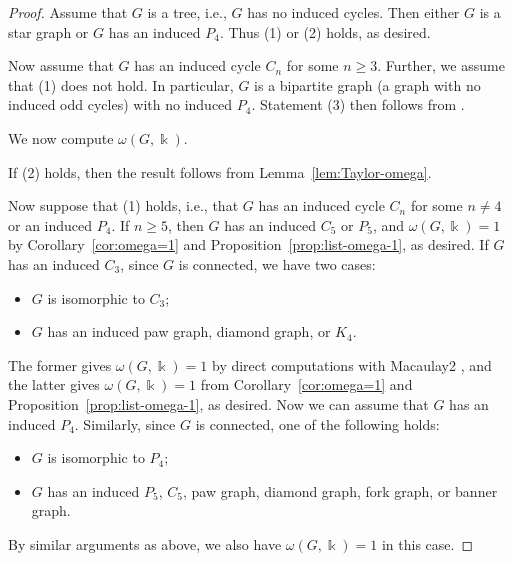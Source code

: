 \documentclass[reqno]{amsart}
\theoremstyle{definition}
\theoremstyle{remark}
\numberwithin{equation}{section}
\begin{document}
\begin{proof}
   Assume that $G$ is a tree, i.e., $G$ has no induced cycles. Then either $G$ is a star graph or $G$ has an induced $P_4$. Thus (1) or (2) holds, as desired.

    Now assume that $G$ has an induced cycle $C_n$ for some $n\geq 3$. Further, we assume that (1) does not hold. In particular, $G$ is a bipartite graph (a graph with no induced odd cycles) with no induced $P_4$. Statement (3) then follows from \cite[Lemma~2]{AlekseevLozin2004}.

    We now compute $\omega(G,\Bbbk)$. 
    
    If (2) holds, then the result follows from Lemma~\ref{lem:Taylor-omega}. 
    
    Now suppose that (1) holds, i.e., that $G$ has an induced cycle $C_n$ for some $n\neq 4$ or an induced $P_4$. If $n\geq 5$, then $G$ has an induced $C_5$ or $P_5$, and $\omega(G,\Bbbk)=1$ by Corollary~\ref{cor:omega=1}  and Proposition~\ref{prop:list-omega-1}, as desired. If $G$ has an induced $C_3$, since $G$ is connected, we have two cases:
    \begin{itemize}
        \item $G$ is isomorphic to $C_3$;
        \item $G$ has an induced paw graph, diamond graph, or $K_4$.
    \end{itemize}
    The former gives $\omega(G,\Bbbk)=1$ by direct computations with Macaulay2 \cite{M2}, and the latter gives $\omega(G,\Bbbk)=1$ from Corollary~\ref{cor:omega=1}  and Proposition~\ref{prop:list-omega-1}, as desired. Now we can assume that $G$ has an induced $P_4$. Similarly, since $G$ is connected, one of the following holds:
    \begin{itemize}
        \item $G$ is isomorphic to $P_4$;
        \item $G$ has an induced $P_5$, $C_5$, paw graph, diamond graph, fork graph, or banner graph.
    \end{itemize}
    By similar arguments as above, we also have $\omega(G,\Bbbk)=1$ in this case.


\end{proof}
\end{document}

